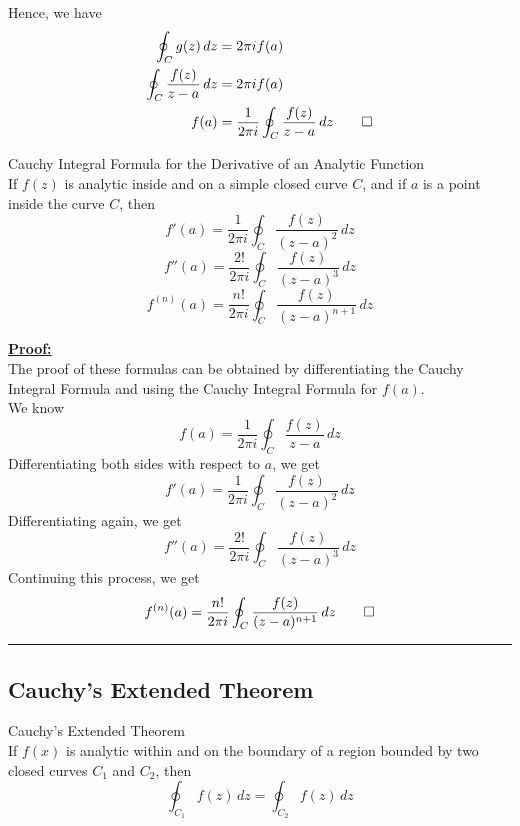 Hence, we have
\begin{align*}
    \oint_C g(z) \, dz &= 2\pi i f(a) \\
    \oint_C \frac{f(z)}{z-a} \, dz &= 2\pi i f(a) \\
    f(a) &= \frac{1}{2\pi i} \oint_C \frac{f(z)}{z-a} \, dz \qed
\end{align*}

\begin{theorem}{Cauchy Integral Formula for the Derivative of an Analytic Function}{}
    \\If $f(z)$ is analytic inside and on a simple closed curve $C$, and if $a$ is a point inside the curve $C$, then
    \begin{equation}
        f'(a) = \frac{1}{2\pi i} \oint_C \frac{f(z)}{(z-a)^2} \, dz
    \end{equation}
    \begin{equation}
        f''(a) = \frac{2!}{2\pi i} \oint_C \frac{f(z)}{(z-a)^3} \, dz
    \end{equation}
    \begin{equation}
        f^{(n)}(a) = \frac{n!}{2\pi i} \oint_C \frac{f(z)}{(z-a)^{n+1}} \, dz
    \end{equation}
\end{theorem}

\underline{\textbf{Proof:}} \\
The proof of these formulas can be obtained by differentiating the Cauchy Integral Formula and using the Cauchy Integral Formula for $f(a)$. \\
We know
\begin{equation}
    f(a) = \frac{1}{2\pi i} \oint_C \frac{f(z)}{z-a} \, dz
\end{equation} 
Differentiating both sides with respect to $a$, we get
\begin{equation}
    f'(a) = \frac{1}{2\pi i} \oint_C \frac{f(z)}{(z-a)^2} \, dz
\end{equation}
Differentiating again, we get
\begin{equation}
    f''(a) = \frac{2!}{2\pi i} \oint_C \frac{f(z)}{(z-a)^3} \, dz
\end{equation}
Continuing this process, we get
\begin{equation}
    f^{(n)}(a) = \frac{n!}{2\pi i} \oint_C \frac{f(z)}{(z-a)^{n+1}} \, dz \qed
\end{equation}

\vspace{20pt}\rule{3in}{1pt}


\subsection{Cauchy's Extended Theorem}
\begin{theorem}{Cauchy's Extended Theorem}{}
    \\If $f(x)$ is analytic within and on the boundary of a region bounded by two closed curves $C_1$ and $C_2$, then
    \begin{equation}
        \oint_{C_1} f(z) \, dz = \oint_{C_2} f(z) \, dz
    \end{equation}
\end{theorem}
